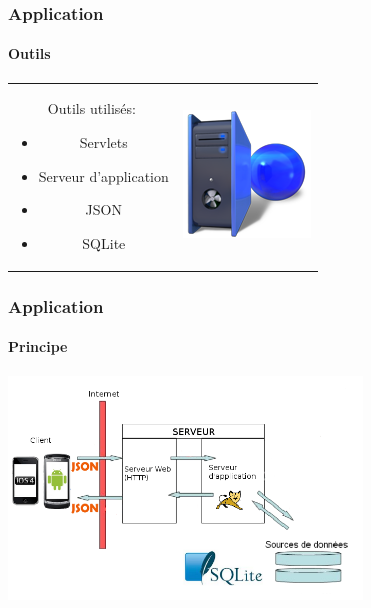 \begin{frame}
\frametitle{Application}
\framesubtitle{Outils}
	\begin{center}
		\begin{tabular}{cc}
			\begin{minipage}{7cm}
			
			\begin{block}{Outils utilisés: }
				\begin{itemize}
				  \item Servlets
				  \item Serveur d'application
				  \item JSON
				  \item SQLite
				\end{itemize}
			\end{block}
			
			\end{minipage}&
			
			\begin{minipage}{4cm}
				\includegraphics[scale=0.5]{img/serveur.png} 
			\end{minipage}\\
				
			\end{tabular}
	\end{center}
			
\end{frame}


\begin{frame}
\frametitle{Application}
\framesubtitle{Principe}

	\begin{center}
		\includegraphics[width=9.4cm]{img/4.png} 
	\end{center}
	

\end{frame}
